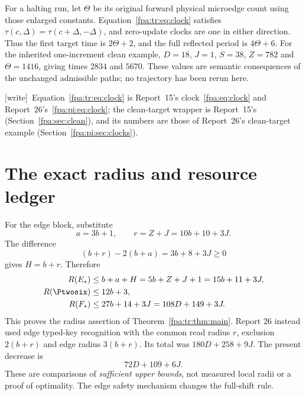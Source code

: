 \documentclass[11pt,a4paper]{article}
\numberwithin{equation}{section}
\newcommand{\Estar}{E_*}\newcommand{\Fstar}{F_*}
\newcommand{\wtag}{\textup{[write]}}
\begin{document}
For a halting run, let $\Theta$ be its original forward physical microedge count using those enlarged constants. Equation~\eqref{fpa:tr:eq:clock} satisfies $\tau(c,\Delta)=\tau(c+\Delta,-\Delta)$, and zero-update clocks are one in either direction. Thus the first target time is $2\Theta+2$, and the full reflected period is $4\Theta+6$. For the inherited one-increment clean example, $D=18$, $J=1$, $S=38$, $Z=782$ and $\Theta=1416$, giving times $2834$ and $5670$. These values are semantic consequences of the unchanged admissible paths; no trajectory has been rerun here.

\wtag\ Equation~\eqref{fpa:tr:eq:clock} is Report~15's clock~\eqref{fpa:eq:clock} and Report~26's~\eqref{fpa:pi:eq:clock}; the clean-target wrapper is Report~15's (Section~\ref{fpa:sec:clean}), and its numbers are those of Report~26's clean-target example (Section~\ref{fpa:pi:sec:clocks}).

\section{The exact radius and resource ledger}\label{fpa:tr:sec:resources}
For the edge block, substitute
\[
a=3b+1,\qquad r=Z+J=10b+10+3J.
\]
The difference
\[
(b+r)-2(b+a)=3b+8+3J\ge0
\]
gives $H=b+r$. Therefore
\begin{align}
R(\Estar)&\le b+a+H=5b+Z+J+1=15b+11+3J,\label{fpa:tr:eq:edge-radius}\\
R(\Ptwosix)&\le12b+3,\notag\\
R(\Fstar)&\le27b+14+3J=108D+149+3J.\notag
\end{align}
This proves the radius assertion of Theorem~\ref{fpa:tr:thm:main}. Report 26 instead used edge typed-key recognition with the common read radius $r$, exclusion $2(b+r)$ and edge radius $3(b+r)$. Its total was $180D+258+9J$. The present decrease is
\[
72D+109+6J.
\]
These are comparisons of \emph{sufficient upper bounds}, not measured local radii or a proof of optimality. The edge safety mechanism changes the full-shift rule.
\end{document}
